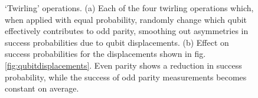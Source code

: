 \begin{figure}
	\centering
	\hspace{0.05\columnwidth}
	\caption{`Twirling' operations. (a) Each of the four twirling operations which, when applied with equal probability, randomly change which qubit effectively contributes to odd parity, smoothing out asymmetries in success probabilities due to qubit displacements. (b) Effect on success probabilities for the displacements shown in fig.\@ \ref{fig:qubitdisplacements}. Even parity shows a reduction in success probability, while the success of odd parity measurements becomes constant on average.}
\end{figure}